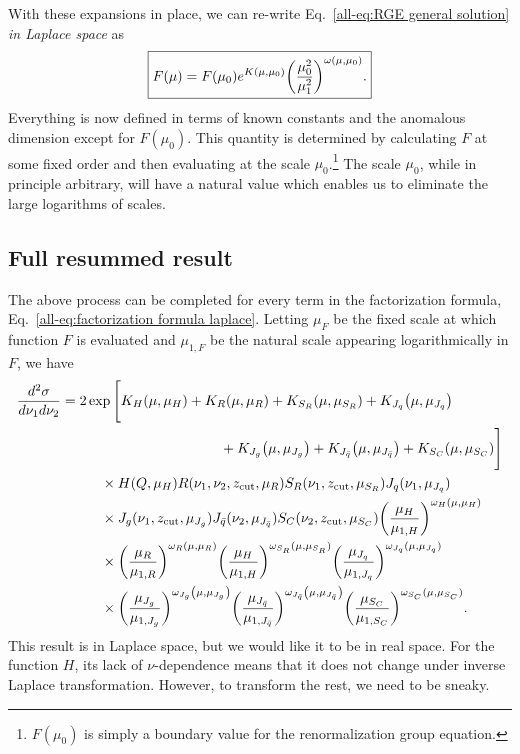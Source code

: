 \documentclass[../thesis.tex]{subfiles}
\providecommand{\zcut}{z_\mathrm{{cut}}}
\begin{document}
	With these expansions in place, we can re-write Eq.~\ref{all-eq:RGE general solution} \textit{in Laplace space} as
	\begin{equation}\label{all-eq:NLL RGE solution Laplace}
	\boxed{
		F(\mu) = F(\mu_0) e^{K(\mu, \mu_0)} \qty(\frac{\mu_0^2}{\mu_1^2})^{\omega(\mu, \mu_0)}.
	}
	\end{equation}
	Everything is now defined in terms of known constants and the anomalous dimension except for $F(\mu_0)$. This quantity is determined by calculating $F$ at some fixed order and then evaluating at the scale $\mu_0$.\footnote{$F(\mu_0)$ is simply a boundary value for the renormalization group equation.} The scale $\mu_0$, while in principle arbitrary, will have a natural value which enables us to eliminate the large logarithms of scales.

\subsection{Full resummed result}\label{all-sec:full resummed result}
	The above process can be completed for every term in the factorization formula, Eq.~\ref{all-eq:factorization formula laplace}. Letting $\mu_F$ be the fixed scale at which function $F$ is evaluated and $\mu_{1, F}$ be the natural scale appearing logarithmically in $F$, we have
	\begin{equation}\label{all-eq:full resummed result Laplace}
	\begin{aligned}
		\frac{d^2\sigma}{d\nu_1 d\nu_2} &= 2 \exp\Bigg[K_H(\mu, \mu_H)  + K_R(\mu, \mu_R) + K_{S_R}(\mu, \mu_{S_R}) + K_{J_q}\qty(\mu, \mu_{J_q})  \\
		&\hspace{4cm}+ K_{J_g}\qty(\mu, \mu_{J_g}) + K_{J_{\bar q}}\qty(\mu, \mu_{J_{\bar q}}) + K_{S_C}(\mu, \mu_{S_C}) \Bigg] \\
		&\hspace{1cm}\times H(Q, \mu_H) R(\nu_1, \nu_2, \zcut, \mu_R) S_R(\nu_1, \zcut, \mu_{S_R}) J_q(\nu_1, \mu_{J_q}) \\
		&\hspace{1cm}\times J_g(\nu_1, \zcut, \mu_{J_g}) J_{\bar q}(\nu_2, \mu_{J_{\bar q}}) S_C(\nu_2, \zcut, \mu_{S_C}) \qty(\frac{\mu_H}{\mu_{1, H}})^{\omega_H(\mu, \mu_H)} \\
		&\hspace{1cm}\times  \qty(\frac{\mu_R}{\mu_{1, R}})^{\omega_R(\mu, \mu_R)} \qty(\frac{\mu_H}{\mu_{1, H}})^{\omega_{S_R}(\mu, \mu_{S_R})} \qty(\frac{\mu_{J_q}}{\mu_{1, J_q}})^{\omega_{J_q}(\mu, \mu_{J_q})} \\
		&\hspace{1cm}\times  \qty(\frac{\mu_{J_g}}{\mu_{1, J_g}})^{\omega_{J_g}\qty(\mu, \mu_{J_g})} \qty(\frac{\mu_{J_{\bar q}}}{\mu_{1, J_{\bar q}}})^{\omega_{J_{\bar q}}\qty(\mu, \mu_{J_{\bar q}})} \qty(\frac{\mu_{S_C}}{\mu_{1, S_C}})^{\omega_{S_C}(\mu, \mu_{S_C})}.
	\end{aligned}
	\end{equation}
	This result is in Laplace space, but we would like it to be in real space. For the function $H$, its lack of $\nu$-dependence means that it does not change under inverse Laplace transformation. However, to transform the rest, we need to be sneaky.
\end{document}
